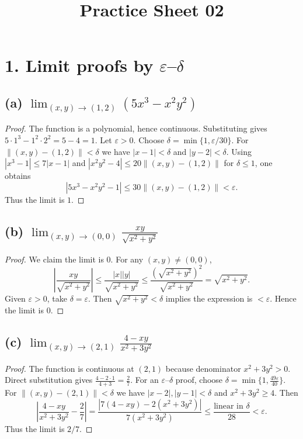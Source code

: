 \documentclass{article}
\begin{document}
\title{Practice Sheet 02}
\author{}
\date{}
\maketitle

\section*{1. Limit proofs by $\varepsilon$–$\delta$}

\subsection*{(a) $\displaystyle \lim_{(x,y)\to(1,2)}(5x^3 - x^2y^2)$}
\begin{proof}
	The function is a polynomial, hence continuous. Substituting gives $5\cdot1^3-1^2\cdot2^2=5-4=1$.
	Let $\varepsilon>0$. Choose $\delta = \min\{1,\varepsilon/30\}$. For $\|(x,y)-(1,2)\|<\delta$ we have $|x-1|<\delta$ and $|y-2|<\delta$. Using $|x^3-1|\le7|x-1|$ and $|x^2y^2-4|\le 20\|(x,y)-(1,2)\|$ for $\delta\le1$, one obtains
	\[
		|5x^3-x^2y^2-1|\le 30\|(x,y)-(1,2)\|<\varepsilon.
	\]
	Thus the limit is $1$.
\end{proof}

\subsection*{(b) $\displaystyle \lim_{(x,y)\to(0,0)}\frac{xy}{\sqrt{x^2+y^2}}$}
\begin{proof}
	We claim the limit is $0$. For any $(x,y)\neq(0,0)$,
	\[
		\left|\frac{xy}{\sqrt{x^2+y^2}}\right|\le \frac{|x||y|}{\sqrt{x^2+y^2}}\le \frac{(\sqrt{x^2+y^2})^2}{\sqrt{x^2+y^2}}=\sqrt{x^2+y^2}.
	\]
	Given $\varepsilon>0$, take $\delta=\varepsilon$. Then $\sqrt{x^2+y^2}<\delta$ implies the expression is $<\varepsilon$. Hence the limit is $0$.
\end{proof}

\subsection*{(c) $\displaystyle \lim_{(x,y)\to(2,1)}\frac{4-xy}{x^2+3y^2}$}
\begin{proof}
	The function is continuous at $(2,1)$ because denominator $x^2+3y^2>0$. Direct substitution gives $\frac{4-2\cdot1}{4+3}= \frac{2}{7}$.
	For an $\varepsilon$–$\delta$ proof, choose $\delta=\min\{1,\frac{49\varepsilon}{40}\}$. For $\|(x,y)-(2,1)\|<\delta$ we have $|x-2|,|y-1|<\delta$ and $x^2+3y^2\ge 4$. Then
	\[
		\left|\frac{4-xy}{x^2+3y^2}-\frac{2}{7}\right|
		= \frac{|7(4-xy)-2(x^2+3y^2)|}{7(x^2+3y^2)}
		\le \frac{\text{linear in }\delta}{28}<\varepsilon.
	\]
	Thus the limit is $2/7$.
\end{proof}
\end{document}
